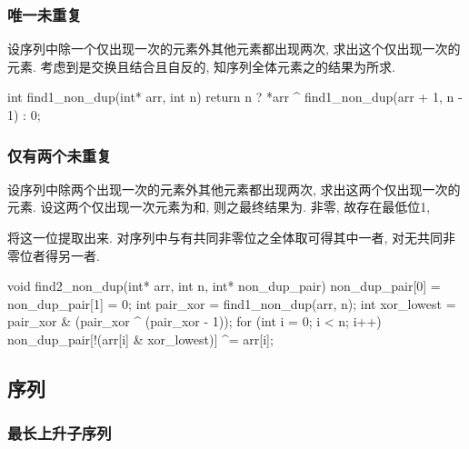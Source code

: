 \documentclass{ctexart}
\begin{document}


\subsubsection{唯一未重复} %
\label{ssub:唯一未重复}

设序列中除一个仅出现一次的元素外其他元素都出现两次, 求出这个仅出现一次的元素. 考虑到是交换且结合且自反的, 知序列全体元素之的结果为所求.

\begin{cpplst}
int find1_non_dup(int* arr, int n)
{
    return n ? *arr ^ find1_non_dup(arr + 1, n - 1) : 0;
}
\end{cpplst}


\subsubsection{仅有两个未重复} %
\label{ssub:仅有两个未重复}

设序列中除两个出现一次的元素外其他元素都出现两次, 求出这两个仅出现一次的元素. 设这两个仅出现一次元素为和, 则之最终结果为. 非零, 故存在最低位1,\\
\centerline{}
将这一位提取出来. 对序列中与有共同非零位之全体取可得其中一者, 对无共同非零位者得另一者.

\begin{cpplst}
void find2_non_dup(int* arr, int n, int* non_dup_pair)
{
    non_dup_pair[0] = non_dup_pair[1] = 0;
    int pair_xor = find1_non_dup(arr, n);
    int xor_lowest = pair_xor & (pair_xor ^ (pair_xor - 1));
    for (int i = 0; i < n; i++)
        non_dup_pair[!(arr[i] & xor_lowest)] ^= arr[i];
}
\end{cpplst}



\subsection{序列} %
\label{sub:序列}

\subsubsection{最长上升子序列} %
\label{ssub:最长上升子序列}
\end{document}
